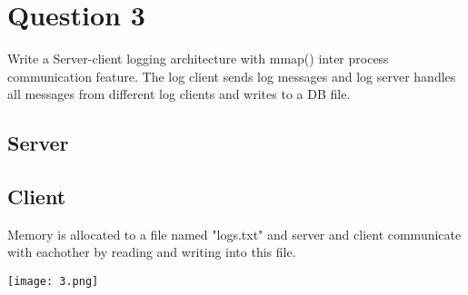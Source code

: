 \documentclass[main.tex]{subfiles}
\begin{document}
\section{Question 3}

Write a Server-client logging architecture with mmap() inter process
communication feature. The log client sends log messages and log server handles
all messages from different log clients and writes to a DB file.

\subsection{Server}

\subsection{Client}


Memory is allocated to a file named "logs.txt" and server and client communicate
with eachother by reading and writing into this file.

\centering\texttt{[image: 3.png]}
\clearpage
\end{document}
